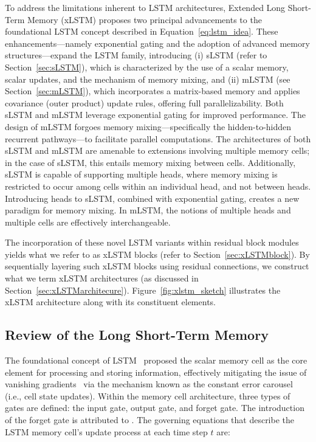 To address the limitations inherent to LSTM architectures, Extended Long Short-Term Memory (xLSTM) proposes two principal advancements to the foundational LSTM concept described in Equation~\eqref{eq:lstm_idea}. These enhancements---namely exponential gating and the adoption of advanced memory structures---expand the LSTM family, introducing (i) sLSTM (refer to Section~\ref{sec:sLSTM}), which is characterized by the use of a scalar memory, scalar updates, and the mechanism of memory mixing, and (ii) mLSTM (see Section~\ref{sec:mLSTM}), which incorporates a matrix-based memory and applies covariance (outer product) update rules, offering full parallelizability. Both sLSTM and mLSTM leverage exponential gating for improved performance. The design of mLSTM forgoes memory mixing---specifically the hidden-to-hidden recurrent pathways---to facilitate parallel computations. The architectures of both sLSTM and mLSTM are amenable to extensions involving multiple memory cells; in the case of sLSTM, this entails memory mixing between cells. Additionally, sLSTM is capable of supporting multiple heads, where memory mixing is restricted to occur among cells within an individual head, and not between heads. Introducing heads to sLSTM, combined with exponential gating, creates a new paradigm for memory mixing. In mLSTM, the notions of multiple heads and multiple cells are effectively interchangeable.

The incorporation of these novel LSTM variants within residual block modules yields what we refer to as xLSTM blocks (refer to Section~\ref{sec:xLSTMblock}). By sequentially layering such xLSTM blocks using residual connections, we construct what we term xLSTM architectures (as discussed in Section~\ref{sec:xLSTMarchitecure}). Figure~\ref{fig:xlstm_sketch} illustrates the xLSTM architecture along with its constituent elements.

\subsection{Review of the Long Short-Term Memory}
\label{sec:orgLSTM}

The foundational concept of LSTM~\citep{Hochreiter:91,Hochreiter:97nips,Hochreiter:97} proposed the scalar memory cell as the core element for processing and storing information, effectively mitigating the issue of vanishing gradients~\citep{Hochreiter:91,Hochreiter:00book} via the mechanism known as the constant error carousel (i.e., cell state updates). Within the memory cell architecture, three types of gates are defined: the input gate, output gate, and forget gate. The introduction of the forget gate is attributed to \citet{Gers:00}. The governing equations that describe the LSTM memory cell’s update process at each time step $t$ are:

